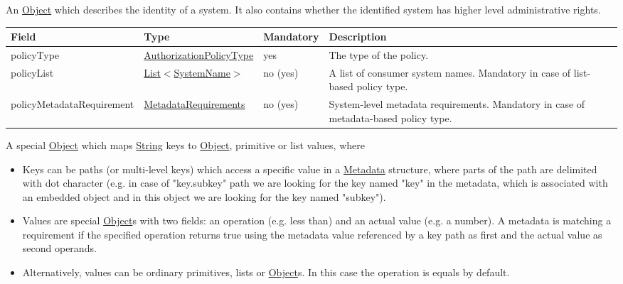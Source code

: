 \documentclass[a4paper]{arrowhead}
\newcommand{\pref}[1]{{\textcolor{ArrowheadGrey}{\hyperref[sec:model:primitives:#1]{#1}}}}
\begin{document}

An \pref{Object} which describes the identity of a system. It also contains whether the identified system has higher level administrative rights.


\begin{table}[ht!]
\begin{tabularx}{\textwidth}{| p{4.3cm} | p{4.1cm} | p{2cm} | X |} \hline
\rowcolor{gray!33} Field & Type & Mandatory & Description \\ \hline
policyType & \pref{AuthorizationPolicyType} & yes & The type of the policy. \\ \hline
policyList & \pref{List}$<$\pref{SystemName}$>$ & no (yes) & A list of consumer system names. Mandatory in case of list-based policy type. \\ \hline
policyMetadataRequirement & \hyperref[sec:model:MetadataRequirements]{MetadataRequirements} & no (yes) & System-level metadata requirements. Mandatory in case of metadata-based policy type. \\ \hline 
\end{tabularx}
\end{table}


A special \pref{Object} which maps \pref{String} keys to \pref{Object}, primitive or list values, where 

\begin{itemize}
    \item Keys can be paths (or multi-level keys) which access a specific value in a \hyperref[sec:model:Metadata]{Metadata} structure, where parts of the path are delimited with dot character (e.g. in case of "key.subkey" path we are looking for the key named "key" in the metadata, which is associated with an embedded object and in this object we are looking for the key named "subkey").
    \item Values are special \pref{Object}s with two fields: an operation (e.g. less than) and an actual value (e.g. a number). A metadata is matching a requirement if the specified operation returns true using the metadata value referenced by a key path as first and the actual value as second operands. 
    \item Alternatively, values can be ordinary primitives, lists or \pref{Object}s. In this case the operation is equals by default.
\end{itemize}
\end{document}
